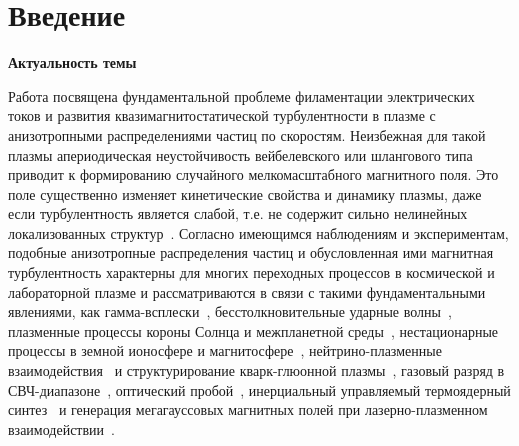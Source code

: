 \chapter*{Введение}                         %
\newcommand{\me}{m_\mathrm{e}}
\newcommand{\wpl}{\omega_\mathrm{p}}

{\bfseries Актуальность темы}

Работа посвящена фундаментальной проблеме филаментации электрических токов и развития квазимагнитостатической турбулентности в плазме с анизотропными распределениями частиц по скоростям. 
Неизбежная для такой плазмы апериодическая неустойчивость вейбелевского или шлангового типа~\cite{Mikhailovsky1971,Krall1973,Kocharovsky2016} приводит к формированию случайного мелкомасштабного магнитного поля. 
Это поле существенно изменяет кинетические свойства и динамику плазмы, даже если турбулентность является слабой, т.е. не содержит сильно нелинейных локализованных структур~\cite{Baumjohann2012,Treumann2009,Marcowith2016,Gary1993,Kalman1968,Morse1971,Stockem2009}. 
Согласно имеющимся наблюдениям и экспериментам, подобные анизотропные распределения частиц и обусловленная ими магнитная турбулентность характерны для многих переходных процессов в космической и лабораторной плазме и рассматриваются в связи с такими фундаментальными явлениями, как гамма-всплески~\cite{Medvedev2006,Lazar2006,SchaeferRolffs2006}, бесстолкновительные ударные волны~\cite{Fiuza2012,Sakai2000,Nishikawa2009}, плазменные процессы короны Солнца и межпланетной среды~\cite{Che2017,Zhou2022,Kuznetsov2025}, нестационарные процессы в земной ионосфере и магнитосфере~\cite{Wu1984,Schlickeiser2011}, нейтрино-плазменные взаимодействия~\cite{Silva1999} и структурирование кварк-глюонной плазмы~\cite{Mrwczyski1988,Arnold2005}, газовый разряд в СВЧ-диапазоне~\cite{Shokri2004, Ghorbanalilu2006}, оптический пробой~\cite{Ghorbanalilu2013, Zhang2019, Zhang2020, Huang2020}, инерциальный управляемый термоядерный синтез~\cite{Tabak1994} и генерация мегагауссовых магнитных полей при лазерно-плазменном взаимодействии~\cite{Shukla2009, Wagner2004,Thaury2010,Schoeffler2016,Stepanov2022,Nechaev2020a,Nechaev2019_Radiophys}.

